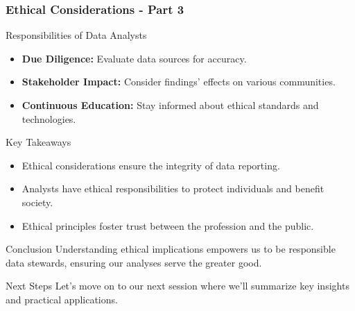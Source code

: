 \documentclass[aspectratio=169]{beamer}
\begin{document}
\begin{frame}[fragile]
    \frametitle{Ethical Considerations - Part 3}
    \begin{block}{Responsibilities of Data Analysts}
        \begin{itemize}
            \item \textbf{Due Diligence:} Evaluate data sources for accuracy.
            \item \textbf{Stakeholder Impact:} Consider findings' effects on various communities.
            \item \textbf{Continuous Education:} Stay informed about ethical standards and technologies.
        \end{itemize}
    \end{block}

    \begin{block}{Key Takeaways}
        \begin{itemize}
            \item Ethical considerations ensure the integrity of data reporting.
            \item Analysts have ethical responsibilities to protect individuals and benefit society.
            \item Ethical principles foster trust between the profession and the public.
        \end{itemize}
    \end{block}
    
    \begin{block}{Conclusion}
        Understanding ethical implications empowers us to be responsible data stewards, ensuring our analyses serve the greater good.
    \end{block}
    
    \begin{block}{Next Steps}
        Let's move on to our next session where we’ll summarize key insights and practical applications.
    \end{block}
\end{frame}
\end{document}
